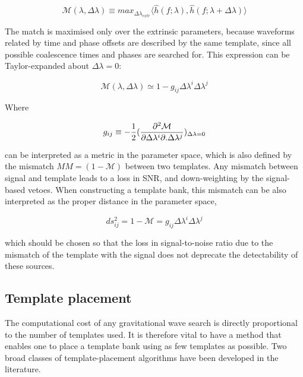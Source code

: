 \documentclass[binding=0.6cm, LaM]{sapthesis}
\begin{document}
		\begin{equation}
			\mathcal{M}(\lambda, \Delta \lambda) \equiv max_{\Delta \lambda_{extr}} \langle\hat h(f;\lambda), \hat h(f;\lambda + \Delta \lambda)  \rangle
		\end{equation}

	The match is maximised only over the extrinsic parameters, 
	because waveforms related by time and phase offsets
	are described by the same template, 
	since all possible coalescence times and phases are searched for.
	This expression can be Taylor-expanded about $\Delta \lambda = 0$:

		\begin{equation}
			\mathcal{M}(\lambda, \Delta \lambda) \simeq 1 - g_{ij} \Delta \lambda^i \Delta \lambda^j
		\end{equation}

	Where 

		\begin{equation}
			 g_{ij} \equiv -{1 \over 2} ({{\partial^2\mathcal{M}} \over {\partial  \Delta \lambda^i  \partial. \Delta \lambda^j}})_{\Delta \lambda = 0}
		\end{equation}

	can be interpreted as a metric in the parameter space, which is also defined
	by the mismatch $MM = (1 − \mathcal{M})$ between two templates.
	Any mismatch between signal and template leads to a loss in SNR, 
	and down-weighting by the signal-based vetoes. 
	When constructing a template bank, this mismatch can be also interpreted 
	as the proper distance in the parameter space,	

		\begin{equation}
			ds_{ij}^2 = 1 − \mathcal{M} = g_{ij} \Delta \lambda^i \Delta \lambda^j
		\end{equation}

	which should be chosen so that the loss in signal-to-noise ratio due to the mismatch 
	of the template with the signal does not deprecate the detectability of these sources.
\subsection{Template placement}


	The computational cost of any gravitational wave search
	 is directly proportional to the number of templates used.
	It is therefore vital to have a method that enables one 
	to place a template bank using as few templates as possible. 
	Two broad classes of template-placement algorithms 
	have been developed in the literature. 
\end{document}
